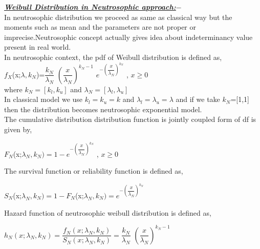 \documentclass[12pt,a4paper,oneside]{article}
\begin{document}
\newpage
 \textrm{\textit{\textbf{\underline{Weibull Distribution in Neutrosophic approach:$-$}}}}\\
 In neutrosophic distribution we proceed as same as classical way but the moments such as mean and the parameters are not proper or imprecise.Neutrosophic concept actually gives idea about indeterminancy value present in real world.\\
 \newline In neutrosophic context, the pdf of Weibull distribution is defined as,\\
 \hspace{5cm}$f_{X}$(x;${\lambda},k_{N}$)=$\dfrac{k_{N}}{\lambda_{N}}$ $\left(\dfrac{x}{\lambda_{N}}\right)^{k_{N}-1}$ $e^{-\left(\dfrac{x}{\lambda_{N}}\right)^{k_{N}}}$ \hspace{1cm}, $x \geq 0$\\
 \newline \newline where $k_{N}=[k_{l},k_{u}]$ and $\lambda_{N}=[\lambda_{l},\lambda_{u}]$\\
 \newline In classical model we use $k_{l}=k_{u}=k$ and $\lambda_{l}=\lambda_{u}=\lambda$ and if we take $k_{N}$=[1,1] then the distribution becomes neutrosophic exponential model.\\
 \newline\newline The cumulative distribution distribution function is jointly coupled form of df is given by,\\
 \begin{singlespace}
\hspace{5cm}$F_{N}$(x;${\lambda_{N}},k_{N})=1-e^{-\left(\dfrac{x}{\lambda_{N}}\right)^{k_{N}}}$ \hspace{1cm}, $x \geq 0$\\
\end{singlespace}
\vspace*{3mm} The survival function or reliability function is defined as,\\
\begin{singlespace}
\hspace{5cm}$S_{N}$(x;${\lambda_{N}},k_{N})=1-F_{N}$(x;${\lambda_{N}},k_{N})=e^{-\left(\dfrac{x}{\lambda_{N}}\right)^{k_{N}}}$ 
\end{singlespace}
Hazard function of neutrosophic weibull distribution is defined as,\\
\begin{singlespace}
\hspace{5cm}$h_{N}(x;{\lambda_{N}},k_{N})=\dfrac{f_{N}(x;{\lambda_{N}},k_{N})}{S_{N}(x;{\lambda_{N}},k_{N})}=\dfrac{k_{N}}{\lambda_{N}}$ $\left(\dfrac{x}{\lambda_{N}}\right)^{k_{N}-1}$
\end{singlespace}
\end{document}
